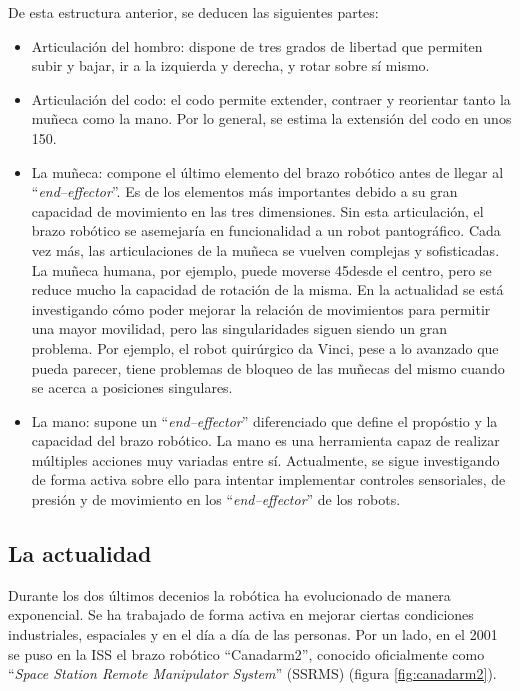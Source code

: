 De esta estructura anterior, se deducen las siguientes partes:

\begin{itemize}
    \item Articulación del hombro: dispone de tres grados de libertad que permiten
    subir y bajar, ir a la izquierda y derecha, y rotar sobre sí mismo.
    \item Articulación del codo: el codo permite extender, contraer y reorientar tanto
    la muñeca como la mano. Por lo general, se estima la extensión del codo en unos
    150\textdegree.
    \item La muñeca: compone el último elemento del brazo robótico antes de llegar
    al ``\textit{end--effector}''. Es de los elementos más importantes debido a su
    gran capacidad de movimiento en las tres dimensiones. Sin esta articulación,
    el brazo robótico se asemejaría en funcionalidad a un robot pantográfico. Cada vez más,
    las articulaciones de la muñeca se vuelven complejas y sofisticadas. La muñeca humana,
    por ejemplo, puede moverse 45\textdegree desde el centro, pero se reduce mucho la
    capacidad de rotación de la misma. En la actualidad se está investigando cómo poder
    mejorar la relación de movimientos para permitir una mayor movilidad, pero las 
    singularidades siguen siendo un gran problema. Por ejemplo, el robot quirúrgico
    da Vinci, pese a lo avanzado que pueda parecer, tiene problemas de bloqueo de las muñecas
    del mismo cuando se acerca a posiciones singulares.
    \item La mano: supone un ``\textit{end--effector}'' diferenciado que define el propóstio
    y la capacidad del brazo robótico. La mano es una herramienta capaz de realizar múltiples
    acciones muy variadas entre sí. Actualmente, se sigue investigando de forma activa sobre
    ello para intentar implementar controles sensoriales, de presión y de movimiento en los
    ``\textit{end--effector}'' de los robots.
\end{itemize}

\subsection{La actualidad}

Durante los dos últimos decenios la robótica ha evolucionado de manera exponencial. Se ha
trabajado de forma activa en mejorar ciertas condiciones industriales, espaciales y
en el día a día de las personas. Por un lado, en el 2001 se puso en la ISS el brazo
robótico ``Canadarm2'', conocido oficialmente como 
``\textit{Space Station Remote Manipulator System}'' (SSRMS) (figura \ref{fig:canadarm2}).

